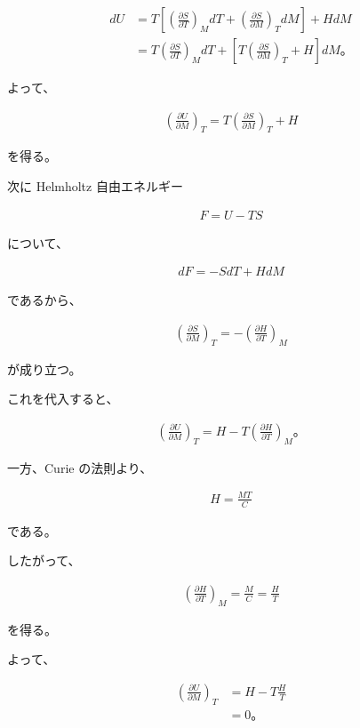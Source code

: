 \documentclass[platex,dvipdfmx,a4paper]{jsarticle}
\begin{document}
\begin{align*}
dU
&=
T
\left[
\left(
\frac{\partial S}{\partial T}
\right)_M dT
+
\left(
\frac{\partial S}{\partial M}
\right)_T dM
\right]
+
HdM \\
&=
T
\left(
\frac{\partial S}{\partial T}
\right)_M dT
+
\left[
T
\left(
\frac{\partial S}{\partial M}
\right)_T
+
H
\right]
dM。
\end{align*}

よって、

\begin{align*}
\left(
\frac{\partial U}{\partial M}
\right)_T
=
T
\left(
\frac{\partial S}{\partial M}
\right)_T
+
H
\end{align*}

を得る。

次に Helmholtz 自由エネルギー

\begin{align*}
F=U-TS
\end{align*}

について、

\begin{align*}
dF
=
-SdT+HdM
\end{align*}

であるから、

\begin{align*}
\left(
\frac{\partial S}{\partial M}
\right)_T
=
-
\left(
\frac{\partial H}{\partial T}
\right)_M
\end{align*}

が成り立つ。

これを代入すると、

\begin{align*}
\left(
\frac{\partial U}{\partial M}
\right)_T
=
H
-
T
\left(
\frac{\partial H}{\partial T}
\right)_M。
\end{align*}

一方、Curie の法則より、

\begin{align*}
H
=
\frac{MT}{C}
\end{align*}

である。

したがって、

\begin{align*}
\left(
\frac{\partial H}{\partial T}
\right)_M
=
\frac{M}{C}
=
\frac{H}{T}
\end{align*}

を得る。

よって、

\begin{align*}
\left(
\frac{\partial U}{\partial M}
\right)_T
&=
H-T\frac{H}{T} \\
&=
0。
\end{align*}
\end{document}
